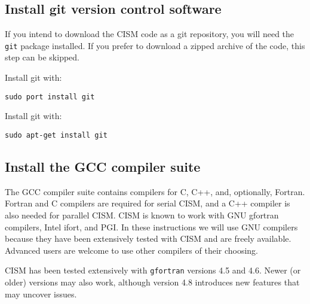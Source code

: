 \subsection{Install git version control software}
If you intend to download the CISM code as a git repository, you will need the \texttt{git} package installed.
If you prefer to download a zipped archive of the code, this step can be skipped.


\begin{mdframed}[style=mac] %
Install git with:

\texttt{sudo port install git}
\end{mdframed}              %


\begin{mdframed}[style=ubuntu] %
Install git with:

\texttt{sudo apt-get install git}
\end{mdframed}                 %


\subsection{Install the GCC compiler suite}

The GCC compiler suite contains compilers for C, C++, and, optionally, Fortran.
Fortran and C compilers are required for serial CISM, and a C++ compiler is also
needed for parallel CISM.  CISM is known to work with GNU gfortran compilers, 
Intel ifort, and PGI.  In these instructions we will use GNU compilers because they
have been extensively tested with CISM and are freely available.  Advanced users
are welcome to use other compilers of their choosing.

CISM has been tested extensively with \texttt{gfortran} versions 4.5 and 4.6.
Newer (or older) versions may also work, although version 4.8 introduces 
new features that may uncover issues.

